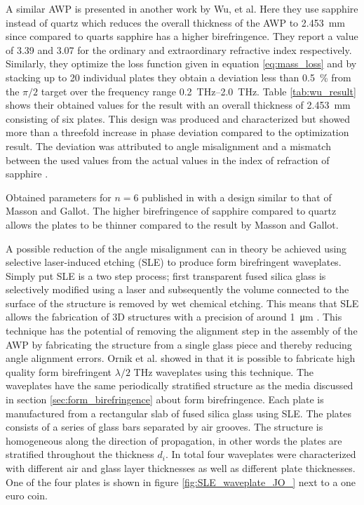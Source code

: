 A similar AWP is presented in another work by Wu, et al. Here they use sapphire instead of quartz which reduces the overall thickness of the AWP to \SI{2.453}{\milli \meter} since compared to quarts sapphire has a higher birefringence. They report a value of 3.39 and 3.07 for the ordinary and extraordinary refractive index respectively. Similarly, they optimize the loss function given in equation \ref{eq:mass_loss} and by stacking up to 20 individual plates they obtain a deviation less than \SI{0.5}{\percent} from the $\pi/2$ target over the frequency range \SIrange{0.2}{2.0}{\tera \hertz}. Table \ref{tab:wu_result} shows their obtained values for the result with an overall thickness of \SI{2.453}{\milli \meter} consisting of six plates. This design was produced and characterized but showed more than a threefold increase in phase deviation compared to the optimization result. The deviation was attributed to angle misalignment and a mismatch between the
used values from the actual values in the index of refraction of sapphire \cite{Wu2020APlate}. 

\begin{table}[h]
    \centering
    
    \caption{Obtained parameters for $n=6$ published in \cite{Wu2020APlate} with a design similar to that of Masson and Gallot. The higher birefringence of sapphire compared to quartz allows the plates to be thinner compared to the result by Masson and Gallot.}
    \label{tab:wu_result}
\end{table}

A possible reduction of the angle misalignment can in theory be achieved using selective laser-induced etching (SLE) to produce form birefringent waveplates. Simply put SLE is a two step process; first transparent fused silica glass is selectively modified using a laser and subsequently the volume connected to the surface of the structure is removed by wet chemical etching. This means that SLE allows the fabrication of 3D structures with a precision of around \SI{1}{\micro \meter} \cite{Hermans2014SelectiveKOH}. This technique has the potential of removing the alignment step in the assembly of the AWP by fabricating the structure from a single glass piece and thereby reducing angle alignment errors. Ornik et al. showed in \cite{Ornik2018HighPlatesb} that it is possible to fabricate high quality form birefringent $\lambda/2$ THz waveplates using this technique. The waveplates have the same periodically stratified structure as the media discussed in section \ref{sec:form_birefringence} about form birefringence. Each plate is manufactured from a rectangular slab of fused silica glass using SLE. The plates consists of a series of glass bars separated by air grooves. The structure is homogeneous along the direction of propagation, in other words the plates are stratified throughout the thickness $d_i$. In total four waveplates were characterized with different air and glass layer thicknesses as well as different plate thicknesses. One of the four plates is shown in figure \ref{fig:SLE_waveplate_JO_} next to a one euro coin.

